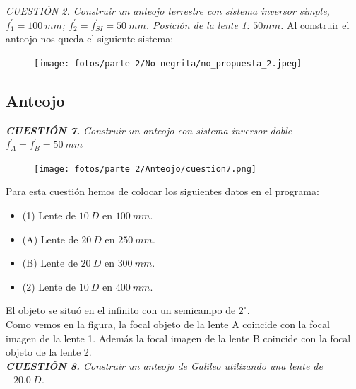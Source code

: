 \documentclass[11pt]{article}
\begin{document}
    
    \textit{CUESTIÓN 2. Construir un anteojo terrestre con sistema inversor simple, $f^\prime_1 = 100\ mm$; $f^\prime_2 = f^\prime_{SI} = 50\ mm$. Posición de la lente 1: $50 mm$.}    
    \noindent Al construir el anteojo nos queda el siguiente sistema:
    \begin{figure}[ht]
        \centering
        \texttt{[image: fotos/parte 2/No negrita/no\_propuesta\_2.jpeg]}
    \end{figure}

    \clearpage
    \subsection{Anteojo}
        \textit{\textbf{CUESTIÓN 7.} Construir un anteojo con sistema inversor doble $f^\prime_A = f^\prime_B = 50\ mm$}\\

            \begin{figure}
                \vspace{-1cm}
                \centering
                \texttt{[image: fotos/parte 2/Anteojo/cuestion7.png]}
            \end{figure}

            Para esta cuestión hemos de colocar los siguientes datos en el programa:
            \begin{itemize}
                \item (1) Lente de $10\ D$ en $100\ mm$.
                \item (A) Lente de $20\ D$ en $250\ mm$.
                \item (B) Lente de $20\ D$ en $300\ mm$.
                \item (2) Lente de $10\ D$ en $400\ mm$.
            \end{itemize}
            El objeto se situó en el infinito con un semicampo de $2^\circ$.\\
            
            Como vemos en la figura, la focal objeto de la lente A coincide con la focal imagen de la lente 1. Además la focal imagen de la lente B coincide con la focal objeto de la lente 2. \\
            
        \vspace{0.4cm}
        \textit{\textbf{CUESTIÓN 8.} Construir un anteojo de Galileo utilizando una lente de $-20.0\ D$.}\\
        
\end{document}
